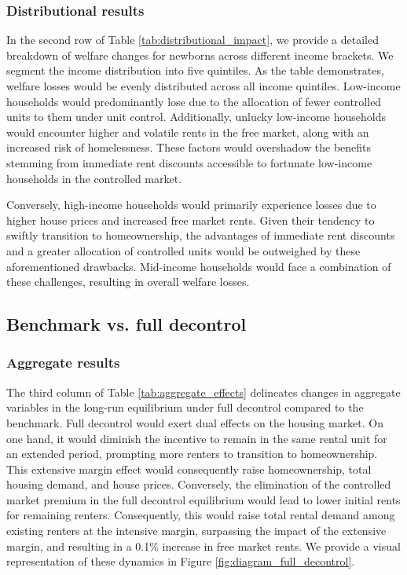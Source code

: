 \documentclass[parskip=full]{article}
\begin{document}
\subsubsection{Distributional results}

In the second row of Table \ref{tab:distributional_impact}, we provide a detailed breakdown of welfare changes for newborns across different income brackets. We segment the income distribution into five quintiles. As the table demonstrates, welfare losses would be evenly distributed across all income quintiles. Low-income households would predominantly lose due to the allocation of fewer controlled units to them under unit control. Additionally, unlucky low-income households would encounter higher and volatile rents in the free market, along with an increased risk of homelessness. These factors would overshadow the benefits stemming from immediate rent discounts accessible to fortunate low-income households in the controlled market. 

Conversely, high-income households would primarily experience losses due to higher house prices and increased free market rents. Given their tendency to swiftly transition to homeownership, the advantages of immediate rent discounts and a greater allocation of controlled units would be outweighed by these aforementioned drawbacks. Mid-income households would face a combination of these challenges, resulting in overall welfare losses.

\subsection{Benchmark vs. full decontrol}

\subsubsection{Aggregate results} The third column of Table \ref{tab:aggregate_effects} delineates changes in aggregate variables in the long-run equilibrium under full decontrol compared to the benchmark. Full decontrol would exert dual effects on the housing market. On one hand, it would diminish the incentive to remain in the same rental unit for an extended period, prompting more renters to transition to homeownership. This extensive margin effect would consequently raise homeownership, total housing demand, and house prices. Conversely, the elimination of the controlled market premium in the full decontrol equilibrium would lead to lower initial rents for remaining renters. Consequently, this would raise total rental demand among existing renters at the intensive margin, surpassing the impact of the extensive margin, and resulting in a 0.1\% increase in free market rents. We provide a visual representation of these dynamics in Figure \ref{fig:diagram_full_decontrol}.
\end{document}
